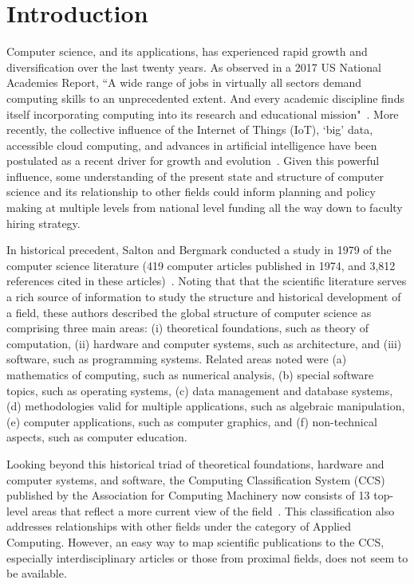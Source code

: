 \section{Introduction}
\label{intro}

Computer science, and its applications, has experienced rapid growth and diversification over the last twenty years. As observed in a 2017 US National Academies Report, ``A wide range of jobs in virtually all sectors demand computing skills to an unprecedented extent. And every academic discipline finds itself incorporating computing into its research and educational mission"~\cite{nas_2017}. More recently, the collective influence of the Internet of Things (IoT), `big' data, accessible cloud computing, and advances in artificial intelligence have been postulated as a recent driver for growth and evolution~\cite{siebel2019_digital}. Given this powerful influence, some understanding of the present state and structure of computer science and its relationship to other fields could inform planning and policy making at multiple levels from national level funding all the way down to faculty hiring strategy.  

In historical precedent, Salton and Bergmark conducted a study  in 1979 of the computer science literature (419 computer articles published in 1974,  and 3,812 references cited in these articles)~\cite{salton_citation_1979}. Noting that that the scientific literature serves a rich source of information to study the structure and historical development of a field, these authors described the global structure of computer science as comprising three main areas: (i) theoretical foundations, such as theory of computation, (ii) hardware and computer systems, such as architecture,  and (iii) software, such as programming systems.  Related areas noted were (a) mathematics of computing, such as numerical analysis, (b) special software topics, such as operating systems, (c) data management and database systems, (d) methodologies valid for multiple applications, such as algebraic manipulation, (e) computer applications, such as computer graphics, and  (f) non-technical aspects, such as computer education. 

Looking beyond this historical triad of theoretical foundations, hardware and computer systems, and software, the Computing Classification System (CCS) published by the Association for Computing Machinery now consists of 13 top-level areas that reflect a more current view of the field~\cite{acm_ref}. This classification also addresses relationships with other fields under the category of Applied Computing. However, an easy way to map scientific publications to the CCS, especially interdisciplinary articles or those from proximal fields, does not seem to be available. 

